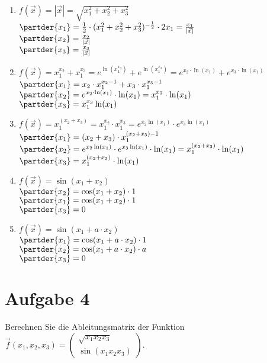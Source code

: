 \documentclass[ngerman, a4paper]{scrartcl}
\begin{document}
	\begin{enumerate}[\textbf{\alph*)}]
		\item $f(\vec{x}) = |\vec{x}| = \sqrt{x_1^2 + x_2^2 + x_3^2}$\\
		$\partder{x_1} = \frac{1}{2} \cdot (x_1^2 + x_2^2 + x_3^2)^{-\frac{1}{2}}\cdot 2x_1 = \frac{x_1}{|\vec{x}|}$\\
		$\partder{x_2} = \frac{x_2}{|\vec{x}|}$\\
		$\partder{x_3} = \frac{x_3}{|\vec{x}|}$\\
		
		\item $ f(\vec{x}) = x_1^{x_2} + x_1^{x_3}  = e^{\ln(x_1^{x_2})} + e^{\ln(x_1^{x_3})} = e^{x_2 \cdot\ln(x_1)} + e^{x_3 \cdot \ln(x_1)} $\\
		$\partder{x_1} = x_2 \cdot x_1^{x_2-1} + x_3\cdot x_1^{x_3-1}$\\
		$\partder{x_2} = e^{x_2 \cdot \ln(x_1)} \cdot \ln(x_1) = x_1^{x_2}\cdot \ln(x_1)$\\
		$\partder{x_3} = x_1^{x_3}\ln(x_1)$
		
		\item $ f(\vec{x}) = x_1^{(x_2 + x_3)} = x_1^{x_2} \cdot x_1^{x_3} = e^{x_2\ln(x_1)} \cdot e^{x_3\ln(x_1)} $\\
		$\partder{x_1} = (x_2 + x_3)\cdot x_1^{(x_2 + x_3)-1}$\\
		$\partder{x_2} = e^{x_2\ln(x_1)} \cdot e^{x_3\ln(x_1)} \cdot \ln(x_1) = x_1^{(x_2 + x_3)} \cdot \ln(x_1)$\\
		$\partder{x_3} = x_1^{(x_2 + x_3)} \cdot \ln(x_1)$
		
		\item $f(\vec{x}) = \sin(x_1 + x_2)$\\
		$\partder{x_2} = \cos(x_1 + x_2) \cdot 1$\\
		$\partder{x_1} = \cos(x_1 + x_2) \cdot 1$\\
		$\partder{x_3} = 0$
		 
		\item $f(\vec{x}) = \sin(x_1 + a\cdot x_2)$\\
		$\partder{x_1} = \cos(x_1 + a\cdot x_2) \cdot 1$\\
		$\partder{x_2} = \cos(x_1 + a\cdot x_2) \cdot a$\\
		$\partder{x_3} = 0$\\
	\end{enumerate}
	
	\section*{Aufgabe 4}
	Berechnen Sie die Ableitungsmatrix der Funktion $\vec{f}(x_1, x_2, x_3) = \begin{pmatrix}
		\sqrt{x_1x_2x_3}\\
		\sin(x_1x_2x_3)
	\end{pmatrix}$.
	
\end{document}
